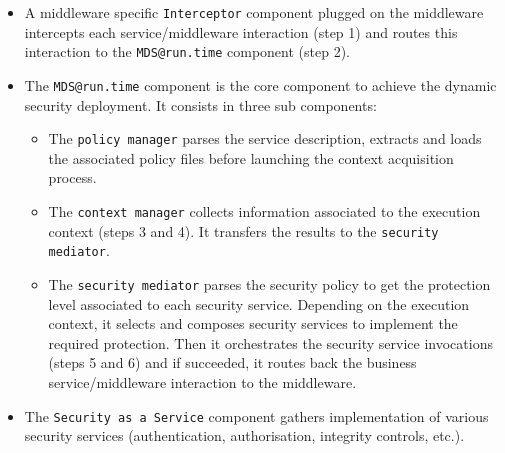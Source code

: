 \documentclass[runningheads,a4paper]{llncs}
\begin{document}
\begin{itemize}
\item A middleware specific \texttt{Interceptor} component plugged on the middleware intercepts each service/middleware interaction (step 1) and routes this interaction to the \texttt{MDS@run.time} component (step 2).
\item	The \texttt{MDS@run.time} component is the core component to achieve the dynamic security deployment. It consists in three sub components:
\begin{itemize}
\item	The \texttt{policy manager} parses the service description, extracts and loads the associated policy files before launching the context acquisition process.
\item The \texttt{context manager} collects information associated to the execution context (steps 3 and 4). It transfers the results to the \texttt{security mediator}.
\item	The \texttt{security mediator} parses the security policy to get the protection level associated to each security service. Depending on the execution context, it selects and composes security services to implement the required protection. Then it orchestrates the security service invocations (steps 5 and 6) and if succeeded, it routes back the business service/middleware interaction to the middleware.
\end{itemize}
\item The \texttt{Security as a Service} component gathers implementation of various security services (authentication, authorisation, integrity controls, etc.).
\end{itemize}
\end{document}
